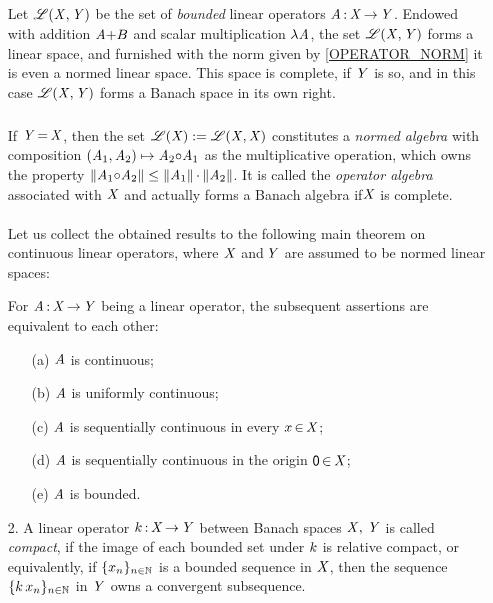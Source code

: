 \documentclass[11pt,twoside]{article}
\begin{document}
\begin{itemize}[leftmargin=12pt,itemsep=3pt]
\subparagraph{} %
Let $\BO{\banX,\banY}$ be the set
of \textit{bounded} linear operators $\linA \: \banX \xto \banY$.
Endowed with addition $\linA{+}\linB$
and scalar multiplication $\lambda \linA$,
the set $\BO{\banX,\banY}$ forms a linear space,
and furnished with the norm given by \eqref{OPERATOR_NORM}
it is even a normed linear space.
This space is complete,
if $\banY$ is so,
and in this case $\BO{\banX,\banY}$ forms a Banach space in its own right.

\subparagraph{} %
If $\banY \eq \banX$,
then the set $\BO{\banX} := \BO{\banX,\banX}$
constitutes a \textit{normed algebra}
with composition $(\linA_1,\linA_2) \mapsto \linA_2 {\circ} \linA_1$
as the multiplicative operation,
which owns the property
$\norm{\linA_1 {\circ} \linA_2} \leq \norm{\linA_1} {\cdot} \norm{\linA_2}$.
It is called the \textit{operator algebra} associated with $\banX$
and actually forms a Banach algebra if$\banX$ is complete.

\paragraph{} %
Let us collect the obtained results 
to the following main theorem on continuous linear operators,
where $\banX$ and\,$\banY$ are assumed to be normed linear spaces:

\begin{theorem}\label{CONTINUITY_THEOREM}
For $\linA \: \banX \xto \banY$ being a linear operator,
the subsequent assertions are equivalent to each other:

\begin{itemize}[leftmargin=9mm]
\item[(a)] $\linA$ is continuous;
\item[(b)] $\linA$ is uniformly continuous;
\item[(c)] $\linA$ is sequentially continuous in every $x \xeof \banX$;
\item[(d)] $\linA$ is sequentially continuous in the origin $\0 \xeof \banX$;
\item[(e)] $\linA$ is bounded.
\end{itemize}
\end{theorem}

\item[2.] %
A linear operator $k {\,:\,} \mathit{X} {\,\to\,} \mathit{Y}$ between Banach spaces
$\mathit{X},\,\mathit{Y}$ is called \textit{compact},
if the image of each bounded set under $k$ is relative compact,
or equivalently,
if $\{x_n\}_{n \in {\mathbb{N}}}$ is a bounded sequence in $\banX$,
then the sequence $\{k \, x_n\}_{n \in {\mathbb{N}}}$ in $\banY$
owns a convergent subsequence.


\end{itemize}
\end{document}
